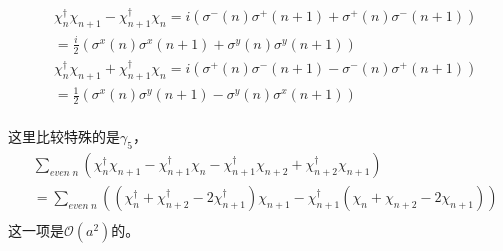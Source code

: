 \begin{equation}
\begin{split}
&\chi^{\dagger}_n\chi_{n+1}-\chi^{\dagger}_{n+1}\chi _n = i \left(\sigma ^-(n)\sigma ^+(n+1)+\sigma ^+(n)\sigma ^- (n+1)\right)\\
&=\frac{i}{2}\left(\sigma ^x(n)\sigma ^x(n+1)+\sigma ^y(n)\sigma ^y(n+1)\right)\\
&\chi^{\dagger}_n\chi_{n+1}+\chi^{\dagger}_{n+1}\chi _n = i\left(\sigma ^+(n)\sigma ^-(n+1)-\sigma ^-(n)\sigma ^+ (n+1)\right) \\
&= \frac{1}{2}\left(\sigma ^x(n)\sigma ^y(n+1)-\sigma ^y(n)\sigma ^x(n+1)\right)\\
\end{split}
\end{equation}

这里比较特殊的是$\gamma _5$，
\begin{equation}
\begin{split}
&\sum _{even\;n}\left(\chi^{\dagger}_n\chi_{n+1}-\chi^{\dagger}_{n+1}\chi _n -\chi^{\dagger}_{n+1}\chi_{n+2} + \chi^{\dagger}_{n+2}\chi _{n+1} \right)\\
&=\sum _{even\;n}\left((\chi^{\dagger}_n+\chi^{\dagger}_{n+2}-2\chi^{\dagger}_{n+1})\chi_{n+1}-\chi^{\dagger}_{n+1}(\chi _n +\chi _{n+2}-2\chi _{n+1})\right)\\
\end{split}
\end{equation}
这一项是$\mathcal{O}(a^2)$的。

